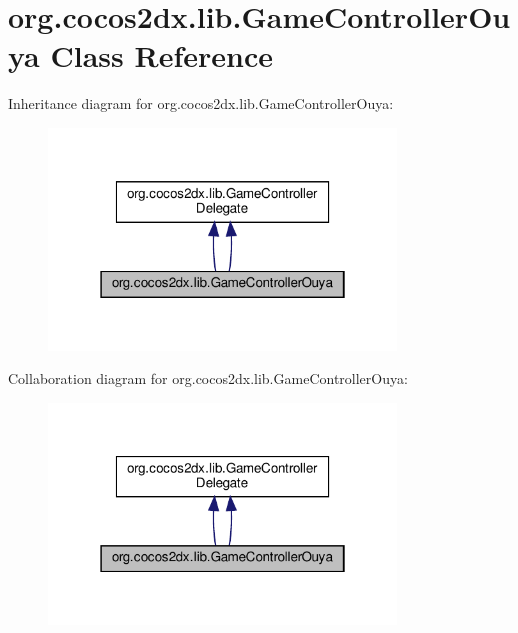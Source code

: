 \hypertarget{classorg_1_1cocos2dx_1_1lib_1_1GameControllerOuya}{}\section{org.\+cocos2dx.\+lib.\+Game\+Controller\+Ouya Class Reference}
\label{classorg_1_1cocos2dx_1_1lib_1_1GameControllerOuya}


Inheritance diagram for org.\+cocos2dx.\+lib.\+Game\+Controller\+Ouya\+:
\nopagebreak
\begin{figure}[H]
\begin{center}
\leavevmode
\includegraphics[width=262pt]{classorg_1_1cocos2dx_1_1lib_1_1GameControllerOuya__inherit__graph}
\end{center}
\end{figure}


Collaboration diagram for org.\+cocos2dx.\+lib.\+Game\+Controller\+Ouya\+:
\nopagebreak
\begin{figure}[H]
\begin{center}
\leavevmode
\includegraphics[width=262pt]{classorg_1_1cocos2dx_1_1lib_1_1GameControllerOuya__coll__graph}
\end{center}
\end{figure}
